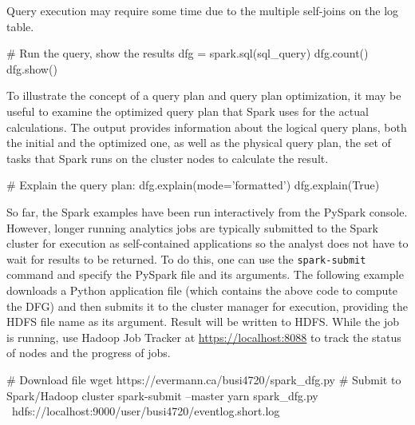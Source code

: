 \begin{withcode}
Query execution may require some time due to the multiple self-joins on the log table. 

\begin{pythoncode}
# Run the query, show the results
dfg = spark.sql(sql_query)
dfg.count()
dfg.show()
\end{pythoncode}

To illustrate the concept of a query plan and query plan optimization, it may be useful to examine the optimized query plan that Spark uses for the actual calculations. The output provides information about the logical query plans, both the initial and the optimized one, as well as the physical query plan, the set of tasks that Spark runs on the cluster nodes to calculate the result.

\begin{pythoncode}
# Explain the query plan:
dfg.explain(mode='formatted')
dfg.explain(True)
\end{pythoncode}

So far, the Spark examples have been run interactively from the PySpark console. However, longer running analytics jobs are typically submitted to the Spark cluster for execution as self-contained applications so the analyst does not have to wait for results to be returned. To do this, one can use the \texttt{spark-submit} command and specify the PySpark file and its arguments. The following example downloads a Python application file (which contains the above code to compute the DFG) and then submits it to the cluster manager for execution, providing the HDFS file name as its argument. Result will be written to HDFS. While the job is running, use Hadoop Job Tracker at \url{https://localhost:8088} to track the status of nodes and the progress of jobs.

\begin{bashcode}
# Download file
wget https://evermann.ca/busi4720/spark_dfg.py
# Submit to Spark/Hadoop cluster
spark-submit --master yarn spark_dfg.py \
 hdfs://localhost:9000/user/busi4720/eventlog.short.log
\end{bashcode}
\end{withcode}

